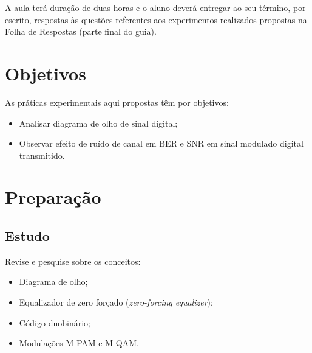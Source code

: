 \documentclass[12pt,addpoints]{exam}
\begin{document}
A aula terá duração de duas horas e o aluno deverá entregar ao seu término, por escrito, respostas às questões referentes aos experimentos realizados propostas na Folha de Respostas (parte final do guia).

\section{Objetivos}

As práticas experimentais aqui propostas têm por objetivos:
\begin{itemize}
    \item Analisar diagrama de olho de sinal digital;
    \item Observar efeito de ruído de canal em BER e SNR em sinal modulado digital transmitido.
\end{itemize}

\section{Preparação} \label{sect:Preparacao}

\subsection{Estudo}

Revise e pesquise sobre os conceitos:
\begin{itemize}
    \item Diagrama de olho;
    \item Equalizador de zero forçado (\textit{zero-forcing equalizer});
    \item Código duobinário;
    \item Modulações M-PAM e M-QAM.
\end{itemize}
\end{document}
